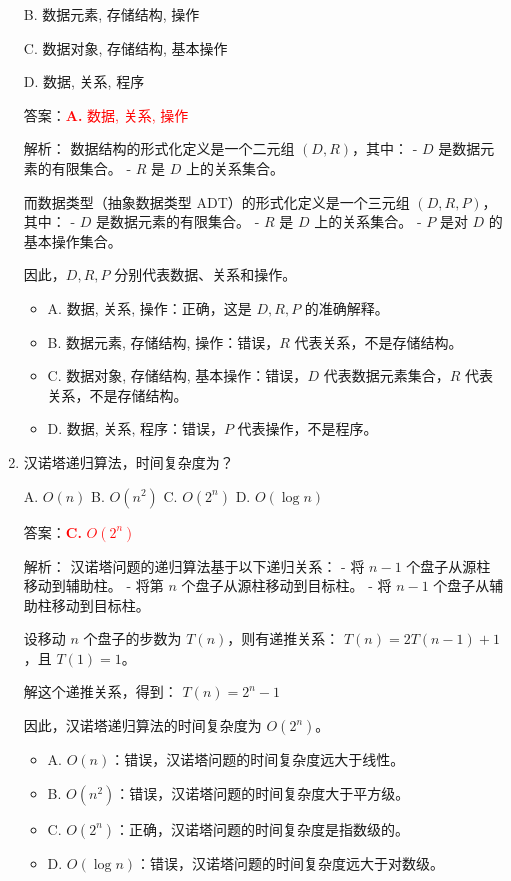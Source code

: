 \documentclass[lang=cn,newtx,10pt,scheme=chinese]{../../../elegantbook}
\begin{document}
\begin{enumerate}
    B. 数据元素, 存储结构, 操作 \

    C. 数据对象, 存储结构, 基本操作 \quad 
    
    D. 数据, 关系, 程序

    答案：\textcolor{red}{\textbf{A.} 数据, 关系, 操作}

    解析：
    数据结构的形式化定义是一个二元组 $(D, R)$，其中：
    - $D$ 是数据元素的有限集合。
    - $R$ 是 $D$ 上的关系集合。
    
    而数据类型（抽象数据类型 ADT）的形式化定义是一个三元组 $(D, R, P)$，其中：
    - $D$ 是数据元素的有限集合。
    - $R$ 是 $D$ 上的关系集合。
    - $P$ 是对 $D$ 的基本操作集合。
    
    因此，$D, R, P$ 分别代表数据、关系和操作。

    \begin{itemize}
        \item A. 数据, 关系, 操作：正确，这是 $D, R, P$ 的准确解释。
        \item B. 数据元素, 存储结构, 操作：错误，$R$ 代表关系，不是存储结构。
        \item C. 数据对象, 存储结构, 基本操作：错误，$D$ 代表数据元素集合，$R$ 代表关系，不是存储结构。
        \item D. 数据, 关系, 程序：错误，$P$ 代表操作，不是程序。
    \end{itemize}

    \item 汉诺塔递归算法，时间复杂度为？\
    
    A. $O(n)$ \quad B. $O(n^2)$ \quad C. $O(2^n)$ \quad D. $O(\log n)$

    答案：\textcolor{red}{\textbf{C.} $O(2^n)$}

    解析：
    汉诺塔问题的递归算法基于以下递归关系：
    - 将 $n-1$ 个盘子从源柱移动到辅助柱。
    - 将第 $n$ 个盘子从源柱移动到目标柱。
    - 将 $n-1$ 个盘子从辅助柱移动到目标柱。
    
    设移动 $n$ 个盘子的步数为 $T(n)$，则有递推关系：
    $T(n) = 2T(n-1) + 1$，且 $T(1) = 1$。
    
    解这个递推关系，得到：
    $T(n) = 2^n - 1$
    
    因此，汉诺塔递归算法的时间复杂度为 $O(2^n)$。

    \begin{itemize}
        \item A. $O(n)$：错误，汉诺塔问题的时间复杂度远大于线性。
        \item B. $O(n^2)$：错误，汉诺塔问题的时间复杂度大于平方级。
        \item C. $O(2^n)$：正确，汉诺塔问题的时间复杂度是指数级的。
        \item D. $O(\log n)$：错误，汉诺塔问题的时间复杂度远大于对数级。
    \end{itemize}


\end{enumerate}
\end{document}
